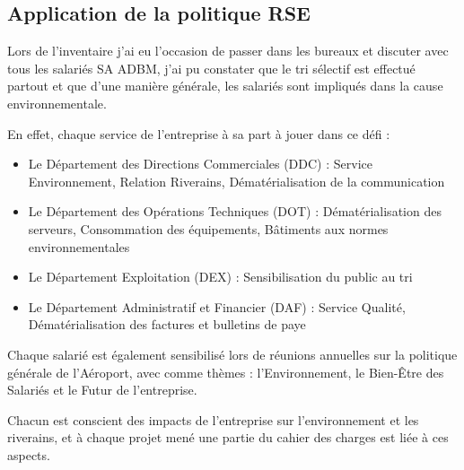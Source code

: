 \subsection{Application de la politique RSE}

Lors de l'inventaire j'ai eu l'occasion de passer dans les bureaux et discuter avec tous les salariés SA ADBM, j'ai pu constater que le tri sélectif est effectué partout et que d'une manière générale, les salariés sont impliqués dans la cause environnementale.

En effet, chaque service de l'entreprise à sa part à jouer dans ce défi :

\begin{itemize}
    \item Le Département des Directions Commerciales (DDC) : Service Environnement, Relation Riverains, Dématérialisation de la communication
    \item Le Département des Opérations Techniques (DOT) : Dématérialisation des serveurs, Consommation des équipements, Bâtiments aux normes environnementales
    \item Le Département Exploitation (DEX) : Sensibilisation du public au tri
    \item Le Département Administratif et Financier (DAF) : Service Qualité, Dématérialisation des factures et bulletins de paye
\end{itemize}

Chaque salarié est également sensibilisé lors de réunions annuelles sur la politique générale de l'Aéroport, avec comme thèmes : l'Environnement, le Bien-Être des Salariés et le Futur de l'entreprise.

Chacun est conscient des impacts de l'entreprise sur l'environnement et les riverains, et à chaque projet mené une partie du cahier des charges est liée à ces aspects.



